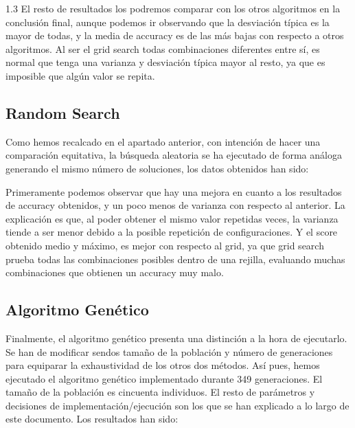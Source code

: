 \documentclass{article}
\begin{document}
\begin{spacing}{1.3}
El resto de resultados los podremos comparar con los otros algoritmos en la conclusión final, aunque podemos ir 
observando que la desviación típica es la mayor de todas, y la media de accuracy es de las más bajas con 
respecto a otros algoritmos. Al ser el grid search todas combinaciones diferentes entre sí, es normal que tenga una
varianza y desviación típica mayor al resto, ya que es imposible que algún valor se repita. \newline

\subsection{Random Search}
Como hemos recalcado en el apartado anterior, con intención de hacer una comparación equitativa, la búsqueda aleatoria se ha ejecutado de forma 
análoga generando el mismo número de soluciones, los datos obtenidos han sido:\newline

\newline

Primeramente podemos observar que hay una mejora en cuanto a los resultados de accuracy 
obtenidos, y un poco menos de varianza con respecto al anterior. La explicación es que, 
al poder obtener el mismo valor repetidas veces, la varianza tiende a ser menor debido a la posible
repetición de configuraciones. Y el score obtenido medio y máximo, es mejor con respecto al grid, ya que 
grid search prueba todas las combinaciones posibles dentro de una rejilla, evaluando muchas
combinaciones que obtienen un accuracy muy malo.\newline

\subsection{Algoritmo Genético}
Finalmente, el algoritmo genético presenta una distinción a la hora de ejecutarlo. Se han de modificar sendos tamaño de la población
y número de generaciones para equiparar la exhaustividad de los otros dos métodos. Así pues, hemos ejecutado el algoritmo genético implementado
durante 349 generaciones. El tamaño de la población es cincuenta individuos. El resto de parámetros y decisiones de implementación/ejecución 
son los que se han explicado a lo largo de este documento. Los resultados han sido:\newline

\newline


\end{spacing}
\end{document}
